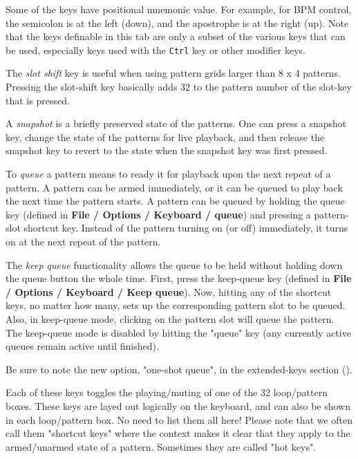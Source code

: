    Some of the keys have positional mnemonic value.  For example,
   for BPM control, the semicolon is at the left (down), and the apostrophe
   is at the right (up).
   Note that the keys definable in this tab are only a subset of the
   various keys that can be used, especially keys used with the
   \texttt{Ctrl} key or other modifier keys.

   The \textsl{slot shift} key is useful when using pattern grids larger
   than 8 x 4 patterns.  Pressing the slot-shift key basically adds 32 to the
   pattern number of the slot-key that is pressed.

   A \textsl{snapshot} is a briefly preserved state of the patterns.
   One can press a snapshot key, change the state of the patterns for live
   playback, and then release the snapshot key to revert to the state when
   the snapshot key was first pressed.

   To \textsl{queue}
   a pattern means to ready it for playback upon the next repeat
   of a pattern.  A pattern can be armed immediately, or it can be queued to
   play back the next time the pattern starts.
   A pattern can be queued by holding the queue key (defined in
   \textbf{File / Options / Keyboard / queue}) and pressing a pattern-slot
   shortcut key.  Instead of the pattern turning on (or off)
   immediately, it turns on at the next repeat of the pattern.

   The \textsl{keep queue}
   functionality allows the queue to be held without holding
   down the queue button the whole time.  First, press the keep-queue key
   (defined in \textbf{File / Options / Keyboard / Keep queue}).  Now, hitting
   any of the shortcut keys, no matter how many, sets up the corresponding
   pattern slot to be queued.  Also, in keep-queue mode, clicking on the
   pattern slot will queue the pattern.  The keep-queue mode is disabled by
   hitting the "queue" key (any currently active queues remain active until
   finished).

   Be sure to note the new option, "one-shot queue", in the extended-keys
   section ().

   Each of these keys toggles the playing/muting of one of the 32
   loop/pattern boxes.  These keys are layed out logically on the keyboard,
   and can also be shown in each loop/pattern box.  No need to list them all
   here!  Please note that we often call them "shortcut keys" where the context
   makes it clear that they apply to the armed/unarmed state of a pattern.
   Sometimes they are called "hot keys".


